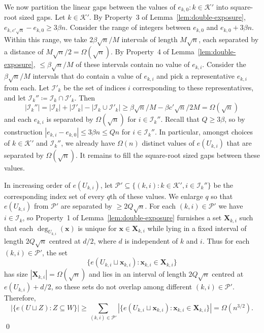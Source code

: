We now partition the linear gaps between the values of $e_{k, 0} : k \in \mathcal{K}'$ into square-root sized gaps. Let $k \in \mathcal{K}'$. By Property~3 of Lemma~\ref{lem:double-exposure}, $e_{k, c'\sqrt{n}} - e_{k, 0} \geq 3\beta n$. Consider the range of integers between $e_{k, 0}$ and $e_{k, 0} + 3\beta n$. Within this range, we take $2\beta\sqrt{n}/M$ intervals of length $M\sqrt{n}$, each separated by a distance of $M\sqrt{n}/2 = \Omega(\sqrt{n})$. By Property~4 of Lemma~\ref{lem:double-exposure}, $\leq \beta \sqrt{n} / M$ of these intervals contain no value of $e_{k, i}$. Consider the $\beta\sqrt{n}/M$ intervals that do contain a value of $e_{k, i}$ and pick a representative $e_{k, i}$ from each. Let $\mathcal{I}'_k$ be the set of indices $i$ corresponding to these representatives, and let $\mathcal{I}_k'' \coloneqq \mathcal{I}_k \cap \mathcal{I}'_k$. Then 
\[
  |\mathcal{I}_k''| = |\mathcal{I}_k| + |\mathcal{I}'_k| - |\mathcal{I}_k \cup \mathcal{I}'_k| \geq \beta\sqrt{n}/M - \beta c' \sqrt{n}/2M = \Omega(\sqrt{n})
\]
and each $e_{k, i}$ is separated by $\Omega(\sqrt{n})$ for $i \in \mathcal{I}_k''$. Recall that $Q \geq 3\beta$, so by construction $|e_{k, i} - e_{k, 0}| \leq 3\beta n \leq Qn$ for $i \in \mathcal{I}_k''$. In particular, amongst choices of $k \in \mathcal{K}'$ and $\mathcal{I}_k''$, we already have $\Omega(n)$ distinct values of $e(U_{k, i})$ that are separated by $\Omega(\sqrt{n})$. It remains to fill the square-root sized gaps between these values. 

In increasing order of $e(U_{k, i})$, let $\mathcal{P}' \subseteq \bigl\{(k, i) : k \in \mathcal{K}', i \in \mathcal{I}_k''\bigr\}$ be the corresponding index set of every $q$th of these values. We enlarge $q$ so that $e(U_{k, i})$ from $\mathcal{P}'$ are separated by $\geq 2Q\sqrt{n}$. For each $(k, i) \in \mathcal{P}'$ we have $i \in \mathcal{I}_k$, so Property~1 of Lemma~\ref{lem:double-exposure} furnishes a set $\mathbf{X}_{k, i}$ such that each $\deg_{U_{k, i}}(\mathbf{x})$ is unique for $\mathbf{x} \in \mathbf{X}_{k, i}$ while lying in a fixed interval of length $2Q\sqrt{n}$ centred at $d/2$, where $d$ is independent of $k$ and $i$. Thus for each $(k, i) \in \mathcal{P}'$, the set
\[
  \bigl\{e(U_{k, i} \sqcup \mathbf{x}_{k, i}) : \mathbf{x}_{k, i} \in \mathbf{X}_{k, i}\bigr\}
\] 
has size $|\mathbf{X}_{k, i}| = \Omega(\sqrt{n})$ and lies in an interval of length $2Q\sqrt{n}$ centred at $e(U_{k, i}) + d/2$, so these sets do not overlap among different $(k, i) \in \mathcal{P}'$. Therefore, 
\[
  \left|\bigl\{e(U \sqcup Z) : Z \subseteq W\bigr\}\right| \geq \sum_{(k, i) \in \mathcal{P}'}\left|\bigl\{e(U_{k, i} \sqcup \mathbf{x}_{k, i}) : \mathbf{x}_{k, i} \in \mathbf{X}_{k, i}\bigr\}\right| = \Omega(n^{3/2}). 
\]
\qed